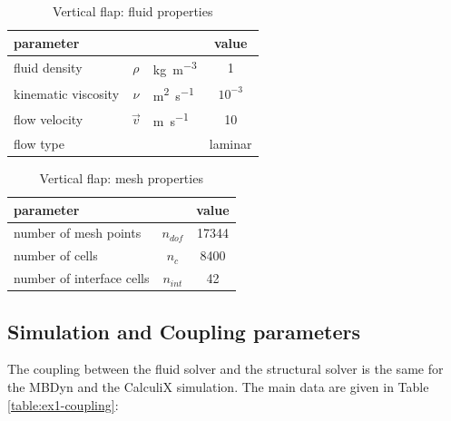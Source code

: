 \begin{table}[!h]
	\begin{center}
		\begin{tabular}{ l c l | c } 
			parameter & & & value  \\ 
			\hline
			fluid density  & $\rho$ & \si{kg.m^{-3}} & 1   \\
			kinematic viscosity & $\nu$& \si{m^2.s^{-1}} & $10^{-3}$  \\
			flow velocity & $\vec{v}$& \si{m.s^{-1}} & 10 \\
			flow type & & & laminar \\
		\end{tabular}
	\end{center}
	\caption{Vertical flap: fluid properties}
	\label{table:ex1-fluid}
\end{table}



\begin{table}[!h]
	\begin{center}
		\begin{tabular}{ l c | c } 
			parameter & & value   \\ 
			\hline
			number of mesh points  & $n_{dof}$ & 17344     \\
			number of cells & $n_c$ & 8400  \\
			number of interface cells  & $n_{int}$ & 42  \\			
		\end{tabular}
	\end{center}
	\caption{Vertical flap: mesh properties}
	\label{table:ex1-mesh}
\end{table}



\subsection{Simulation and Coupling parameters}

The coupling between the fluid solver and the structural solver is the same for the MBDyn and the CalculiX simulation. The main data are given in Table \ref{table:ex1-coupling}:


